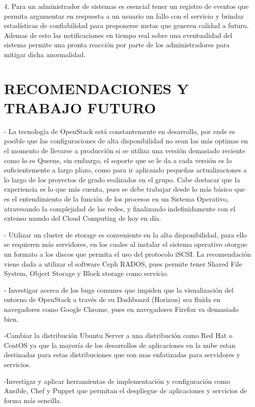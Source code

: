     4. Para un administrador de sistemas es esencial tener un registro de eventos que permita argumentar en respuesta a un usuario un fallo con el servicio y brindar estadísticas de confiabilidad para proponerse metas que generen calidad a futuro. Ademas de esto las notificaciones en tiempo real sobre una eventualidad del sistema permite una pronta reacción por parte de los administradores para mitigar dicha anormalidad.
    
    \newpage\chapter{RECOMENDACIONES Y TRABAJO FUTURO}
    
    - La tecnología de OpenStack está constantemente en desarrollo, por ende es posible que las configuraciones de alta disponibilidad no sean las más optimas en el momento de llevarse a producción si se utiliza una versión demasiado reciente como lo es Queens, sin embargo, el soporte que se le da a cada versión es lo suficientemente a largo plazo, como para ir aplicando pequeñas actualizaciones a lo largo de los proyectos de grado realizados en el grupo. Cabe destacar que la experiencia es lo que más cuenta, pues se debe trabajar desde lo más básico que es el entendimiento de la función de los procesos en un Sistema Operativo, atravesando la complejidad de las redes, y finalizando indefinidamente con el extenso mundo del Cloud Computing de hoy en día.
    
    - Utilizar un cluster de storage es conveniente en la alta disponibilidad, para ello se requieren más servidores, en los cuales al instalar el sistema operativo otorgue un formato a los discos que permita el uso del protocolo iSCSI. La recomendación viene dada a utilizar el software Ceph RADOS, pues permite tener Shared File System, Object Storage y Block storage como servicio.
    
    - Investigar acerca de los bugs comunes que impiden que la visualización del entorno de OpenStack a través de su Dashboard (Horizon) sea fluida en navegadores como Google Chrome, pues en navegadores Firefox va demasiado bien.
    
    -Cambiar la distribución Ubuntu Server a una distribución como Red Hat o CentOS ya que la mayoría de los desarrollos de aplicaciones en la nube estan destinadas para estas distribuciones que son mas enfatizadas para servidores y servicios.
    
    -Investigar y aplicar herramientas de implementación y configuración como Ansible, Chef y Puppet que permitan el despliegue de aplicaciones y servicios de forma más sencilla.
    
